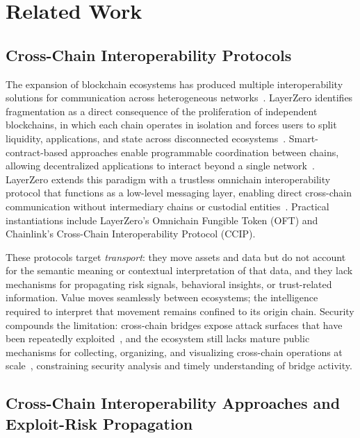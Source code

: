 \documentclass[journal]{IEEEtran}
\begin{document}
\section{Related Work}\label{sec:rw}

\subsection{Cross-Chain Interoperability Protocols}

The expansion of blockchain ecosystems has produced multiple
interoperability solutions for communication across heterogeneous
networks~\cite{BelchiorVGC22}. LayerZero identifies fragmentation as a
direct consequence of the proliferation of independent blockchains, in
which each chain operates in isolation and forces users to split
liquidity, applications, and state across disconnected
ecosystems~\cite{abs-2110-13871}. Smart-contract-based approaches
enable programmable coordination between chains, allowing decentralized
applications to interact beyond a single network~\cite{KhanAAA21a}.
LayerZero extends this paradigm with a trustless omnichain
interoperability protocol that functions as a low-level messaging
layer, enabling direct cross-chain communication without intermediary
chains or custodial entities~\cite{abs-2110-13871}. Practical
instantiations include LayerZero's Omnichain Fungible Token (OFT) and
Chainlink's Cross-Chain Interoperability Protocol (CCIP).

These protocols target \textit{transport}: they move assets and data
but do not account for the semantic meaning or contextual
interpretation of that data, and they lack mechanisms for propagating
risk signals, behavioral insights, or trust-related information. Value
moves seamlessly between ecosystems; the intelligence required to
interpret that movement remains confined to its origin chain. Security
compounds the limitation: cross-chain bridges expose attack surfaces
that have been repeatedly
exploited~\cite{ZhangZZL24,LiQXZZWX25,augusto2024sok}, and the
ecosystem still lacks mature public mechanisms for collecting,
organizing, and visualizing cross-chain operations at
scale~\cite{SantosAVC25}, constraining security analysis and timely
understanding of bridge activity.

\subsection{Cross-Chain Interoperability Approaches and Exploit-Risk
Propagation}\label{sec:rw:exploit-prop}
\end{document}
